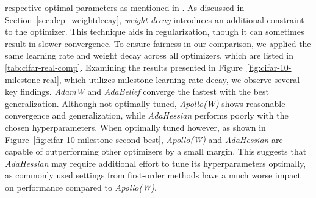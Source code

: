 respective optimal parameters as mentioned in \cite{apollo}.
As discussed in Section~\ref{sec:dcp_weightdecay}, \emph{weight decay} introduces
an additional constraint to the optimizer. This technique aids in regularization,
though it can sometimes result in slower convergence.
To ensure fairness in our comparison, we applied the same learning rate and weight decay across all optimizers,
which are listed in \ref{tab:cifar-real-comp}.
Examining the results presented in Figure~\ref{fig:cifar-10-milestone-real}, which utilizes milestone
learning rate decay, we observe several key findings. \emph{AdamW} and \emph{AdaBelief} converge the fastest with the best generalization.
Although not optimally tuned, \emph{Apollo(W)} shows reasonable convergence and generalization,
while \emph{AdaHessian} performs poorly with the chosen hyperparameters.
When optimally tuned however, as shown in Figure~\ref{fig:cifar-10-milestone-second-best}, \emph{Apollo(W)} and \emph{AdaHessian} are capable of 
outperforming other optimizers by a small margin. This suggests that \emph{AdaHessian} may require additional effort to tune its hyperparameters optimally,
as commonly used settings from first-order methods have a much worse impact on performance compared to \emph{Apollo(W)}.




